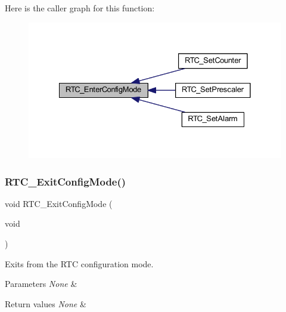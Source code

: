 Here is the caller graph for this function\+:
\nopagebreak
\begin{figure}[H]
\begin{center}
\leavevmode
\includegraphics[width=328pt]{group___r_t_c___private___functions_ga23612d9da2fe057a0cd72c684e5b438a_icgraph}
\end{center}
\end{figure}
\mbox{\label{group___r_t_c___private___functions_ga7585aa6e2dbb497173b2fd03bac0d304}} 
\subsubsection{\texorpdfstring{R\+T\+C\+\_\+\+Exit\+Config\+Mode()}{RTC\_ExitConfigMode()}}
{\footnotesize\ttfamily void R\+T\+C\+\_\+\+Exit\+Config\+Mode (\begin{DoxyParamCaption}\item[{void}]{ }\end{DoxyParamCaption})}



Exits from the R\+TC configuration mode. 


\begin{DoxyParams}{Parameters}
{\em None} & \\
\hline
\end{DoxyParams}

\begin{DoxyRetVals}{Return values}
{\em None} & \\
\hline
\end{DoxyRetVals}


